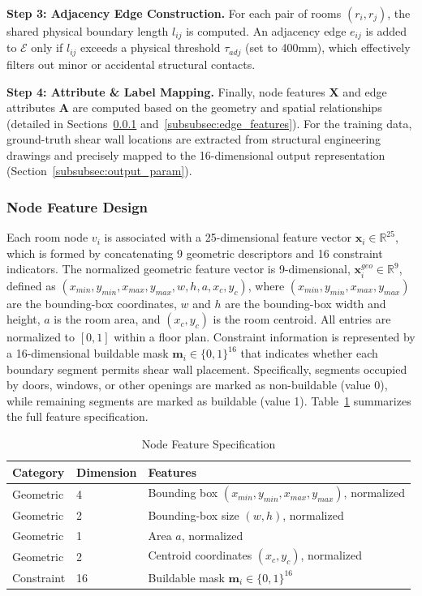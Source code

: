 \textbf{Step 3: Adjacency Edge Construction.} For each pair of rooms $(r_i, r_j)$, the shared physical boundary length $l_{ij}$ is computed. An adjacency edge $e_{ij}$ is added to $\mathcal{E}$ only if $l_{ij}$ exceeds a physical threshold $\tau_{adj}$ (set to 400mm), which effectively filters out minor or accidental structural contacts.

\textbf{Step 4: Attribute \& Label Mapping.} Finally, node features $\mathbf{X}$ and edge attributes $\mathbf{A}$ are computed based on the geometry and spatial relationships (detailed in Sections~\ref{subsubsec:node_features} and~\ref{subsubsec:edge_features}). For the training data, ground-truth shear wall locations are extracted from structural engineering drawings and precisely mapped to the 16-dimensional output representation (Section~\ref{subsubsec:output_param}).

\subsubsection{Node Feature Design}
\label{subsubsec:node_features}

Each room node $v_i$ is associated with a 25-dimensional feature vector $\mathbf{x}_i \in \mathbb{R}^{25}$, which is formed by concatenating 9 geometric descriptors and 16 constraint indicators.
The normalized geometric feature vector is 9-dimensional, $\mathbf{x}_i^{geo}\in\mathbb{R}^{9}$, defined as
$(x_{min}, y_{min}, x_{max}, y_{max}, w, h, a, x_c, y_c)$, where $(x_{min},y_{min},x_{max},y_{max})$ are the bounding-box coordinates, $w$ and $h$ are the bounding-box width and height, $a$ is the room area, and $(x_c,y_c)$ is the room centroid.
All entries are normalized to $[0,1]$ within a floor plan.
Constraint information is represented by a 16-dimensional buildable mask $\mathbf{m}_i \in \{0,1\}^{16}$ that indicates whether each boundary segment permits shear wall placement.
Specifically, segments occupied by doors, windows, or other openings are marked as non-buildable (value 0), while remaining segments are marked as buildable (value 1).
Table~\ref{tab:node_features} summarizes the full feature specification.

\begin{table}[t]
\centering
\caption{Node Feature Specification}
\label{tab:node_features}
\small
\begin{tabularx}{\columnwidth}{llX}
\toprule
Category & Dimension & Features \\\midrule
Geometric & 4 & Bounding box $(x_{min}, y_{min}, x_{max}, y_{max})$, normalized \\
Geometric & 2 & Bounding-box size $(w, h)$, normalized \\
Geometric & 1 & Area $a$, normalized \\
Geometric & 2 & Centroid coordinates $(x_c, y_c)$, normalized \\
Constraint & 16 & Buildable mask $\mathbf{m}_i \in \{0,1\}^{16}$ \\
\bottomrule
\end{tabularx}
\end{table}

